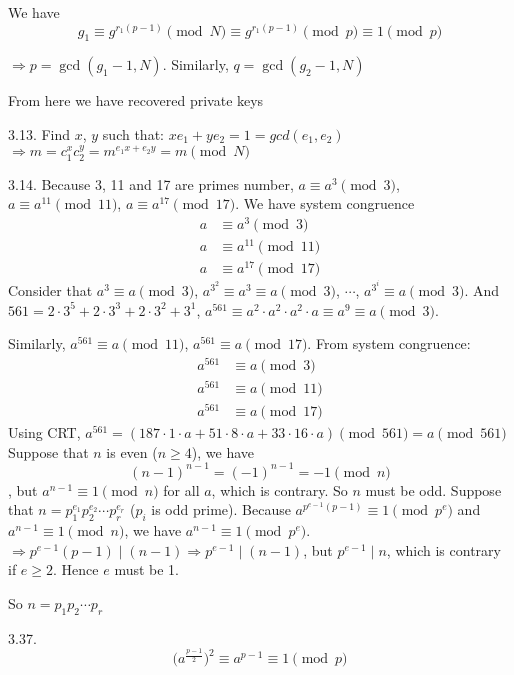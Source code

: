 	We have 
	\[g_1 \equiv g^{r_1 (p-1)} \pmod N \equiv g^{r_1 (p-1)} \pmod p \equiv 1 \pmod p\]
	
	$\Rightarrow p = \gcd(g_1-1, N)$. Similarly, $q = \gcd(g_2-1, N)$
	
	From here we have recovered private keys
	


3.13. Find $x$, $y$ such that: $xe_1 + ye_2=1=gcd(e_1,e_2)$ \\ $\Rightarrow m=c_1^x c_2^y = m^{e_1 x + e_2 y} = m \pmod{N}$

3.14. Because 3, 11 and 17 are primes number, $a \equiv a^3 \pmod 3$, $a \equiv a^{11} \pmod{11}$, $a \equiv a^{17} \pmod{17}$. We have system congruence
		\begin{align*}
			a & \equiv a^3 \pmod 3 \\ a & \equiv a^{11} \pmod{11} \\ a & \equiv a^{17} \pmod{17}
		\end{align*}
		Consider that $a^3 \equiv a \pmod 3$, $a^{3^2} \equiv a^3 \equiv a \pmod 3$, $\cdots$, $a^{3^i} \equiv a \pmod 3$. And $561 = 2 \cdot 3^5 + 2 \cdot 3^3 + 2 \cdot 3^2 + 3^1$, $a^{561} \equiv a^2 \cdot a^2 \cdot a^2 \cdot a \equiv a^9 \equiv a \pmod 3$.
		
		Similarly, $a^{561} \equiv a \pmod{11}$, $a^{561} \equiv a \pmod{17}$. From system congruence:
		\begin{align*}
			a^{561} & \equiv a \pmod 3 \\ a^{561} & \equiv a \pmod{11} \\ a^{561} & \equiv a \pmod{17}
		\end{align*}
		Using CRT, $a^{561} = (187 \cdot 1 \cdot a + 51 \cdot 8 \cdot a + 33 \cdot 16 \cdot a) \pmod{561} = a \pmod{561}$
		 Suppose that $n$ is even ($n \geq 4$), we have 
		\[(n-1)^{n-1} = (-1)^{n-1} = -1 \pmod n\]
		, but $a^{n-1} \equiv 1 \pmod n$ for all $a$, which is contrary. So $n$ must be odd.
		 Suppose that $n = p_1^{e_1} p_2^{e_2} \cdots p_r^{e_r}$ ($p_i$ is odd prime). Because $a^{p^{e-1} (p-1)} \equiv 1 \pmod{p^e}$ and $a^{n-1} \equiv 1 \pmod n$, we have $a^{n-1} \equiv 1 \pmod{p^e}$. \\ $\Rightarrow p^{e-1}(p-1) \mid (n-1) \Rightarrow p^{e-1} \mid (n-1)$, but $p^{e-1} \mid n$, which is contrary if $e \geq 2$. Hence $e$ must be 1.
		
		So $n = p_1 p_2 \cdots p_r$
		


3.37. \[\Big(a^{\frac{p-1}{2}}\Big)^2 \equiv a^{p-1} \equiv 1 \pmod p\]

